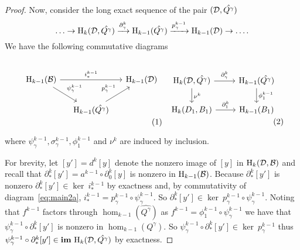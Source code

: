 \begin{proof}
  Now, consider the long exact sequence of the pair $({\mathcal{D}}, \hat{Q^\gamma})$
  \[\ldots\to\mathrm{H}_k({\mathcal{D}}, \hat{Q^\gamma})\xrightarrow{\partial^k_\gamma}
    \mathrm{H}_{k-1}(\hat{Q^\gamma})\xrightarrow{p^{k-1}_\gamma}
    \mathrm{H}_{k-1}({\mathcal{D}})\to\ldots.\]
  We have the following commutative diagrams

  \begin{small}\begin{subequations}\label{eq:main2}
  \begin{minipage}{0.5\textwidth}\begin{equation}\label{eq:main2a}\begin{tikzcd}[column sep=small]
      \hom_{k-1}(\B)\arrow{dr}{\psi_\gamma^{k-1}}\arrow{rr}{i_*^{k-1}} & &
      \hom_{k-1}(\D)\\
    & \hom_{k-1}(\hat{Q^\gamma})\arrow{ur}{p_\gamma^{k-1}}
  \end{tikzcd}\end{equation}\end{minipage}
  \begin{minipage}{0.43\textwidth}\begin{equation}\label{eq:main2b}\begin{tikzcd}
    \hom_{k}(\D, \hat{Q^\gamma})\arrow{r}{\partial_\gamma^k}\arrow{d}{\nu^k} &
    \hom_{k-1}(\hat{Q^\gamma})\arrow{d}{\phi_1^{k-1}}\\
    \hom_{k}(D_1, B_1)\arrow{r}{\partial_1^k} &
    \hom_{k-1}(B_1)
  \end{tikzcd}\end{equation}\end{minipage}
  \end{subequations}\end{small}\vspace{2ex}

  \noindent where $\psi_\gamma^{k-1}, \sigma_\gamma^{k-1}, \phi_1^{k-1}$ and $\nu^k$ are induced by inclusion.

  For brevity, let $[y'] = d^k[y]$ denote the nonzero image of $[y]$ in $\mathrm{H}_k({\mathcal{D}}, {\mathcal{B}})$ and recall that $\partial_*^k[y'] = a^{k-1}\circ\partial_0^k[y]$ is nonzero in $\mathrm{H}_{k-1}({\mathcal{B}})$.
  Because $\partial_*^k[y']$ is nonzero $\partial_*^k[y']\in\ker~i_*^{k-1}$ by exactness and, by commutativity of diagram~\ref{eq:main2a}, $i_*^{k-1} = p_\gamma^{k-1}\circ\psi_\gamma^{k-1}$.
  So $\partial_*^k[y']\in \ker~p_\gamma^{k-1}\circ\psi_\gamma^{k-1}$.
  Noting that $f^{k-1}$ factors through $\hom_{k-1}(\hat{Q^\gamma})$ as $f^{k-1} = \phi_1^{k-1}\circ\psi_\gamma^{k-1}$ we have that $\psi_\gamma^{k-1}\circ\partial_*^k[y']$ is nonzero in $\hom_{k-1}(Q^\gamma)$.
  So $\psi_\gamma^{k-1}\circ\partial_*^k[y']\in\ker~p_\gamma^{k-1}$ thus $\psi_\gamma^{k-1}\circ\partial_*^k[y'] \in\mathbf{im}~\mathrm{H}_k({\mathcal{D}}, \hat{Q^\gamma})$ by exactness.


\end{proof}
